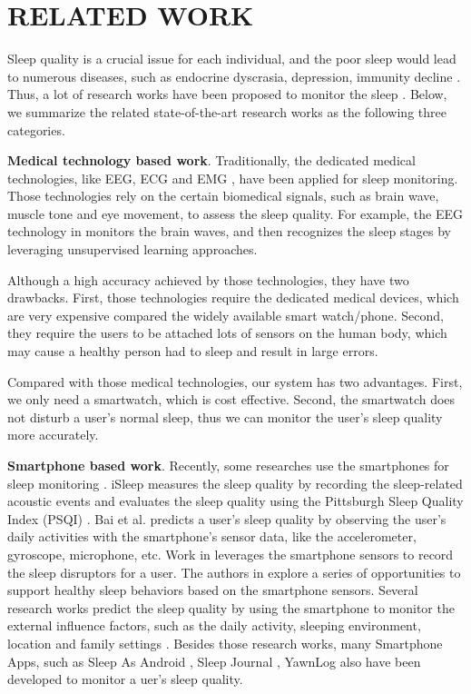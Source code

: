 \section{RELATED WORK}\label{sec:5related}

Sleep quality is a crucial issue for each individual, and the poor sleep would lead to numerous diseases, such as  endocrine dyscrasia, depression, immunity decline \cite{vgontzas2009insomnia,gottlieb2005association}. Thus, a lot of research works have been proposed to monitor the sleep \cite{langkvist2012sleep,hao2013isleep,bai2012will,kay2012lullaby,bain2003evaluation,pombo2016ubisleep}. Below, we summarize the related state-of-the-art research works as the following three categories.

\textbf{Medical technology based work}. Traditionally, the dedicated medical technologies, like EEG, ECG and EMG \cite{saper2005hypothalamic}, have been applied for sleep monitoring. Those technologies rely on the certain biomedical signals, such as brain wave, muscle tone and eye movement, to assess the sleep quality. For example, the EEG technology in \cite{langkvist2012sleep,oropesa1999sleep,ebrahimi2008automatic} monitors the brain waves, and then recognizes the sleep stages by leveraging unsupervised learning approaches.

Although a high accuracy achieved by those  technologies, they have two drawbacks. First, those  technologies require the dedicated medical devices, which are very expensive compared the widely available  smart watch/phone. Second, they require the users to be attached lots of sensors on the human body, which may cause a healthy person had to sleep and result in large errors.

Compared with those medical technologies, our system has two advantages. First, we only need a smartwatch, which is cost effective. Second, the smartwatch does not disturb a user's normal sleep, thus we can monitor the user's sleep quality more accurately.

\textbf{Smartphone based work}. Recently, some researches use the smartphones for sleep monitoring \cite{hao2013isleep,bai2012will,kay2012lullaby,choe2011opportunities} . iSleep \cite{hao2013isleep} measures the sleep quality by recording the sleep-related acoustic events and evaluates the sleep quality using the Pittsburgh Sleep Quality Index (PSQI) \cite{carpenter1998psychometric}. Bai et al. \cite{bai2012will} predicts a user's sleep quality by observing the user's daily activities with the smartphone's sensor data, like the accelerometer, gyroscope, microphone, etc. Work in \cite{kay2012lullaby} leverages the smartphone sensors to record the sleep disruptors for a user. The authors in \cite{choe2011opportunities}  explore a series of opportunities to support healthy sleep behaviors based on the smartphone sensors. Several research works predict the sleep quality by using the smartphone to monitor the external  influence  factors, such as the daily activity, sleeping environment, location and family settings \cite{chen2013unobtrusive,zhang2013real}. Besides those research works, many Smartphone Apps, such as Sleep As Android \cite{SleepAndroid}, Sleep Journal \cite{SleepJournal}, YawnLog \cite{YawnLog} also have been developed to monitor a uer's sleep quality.

